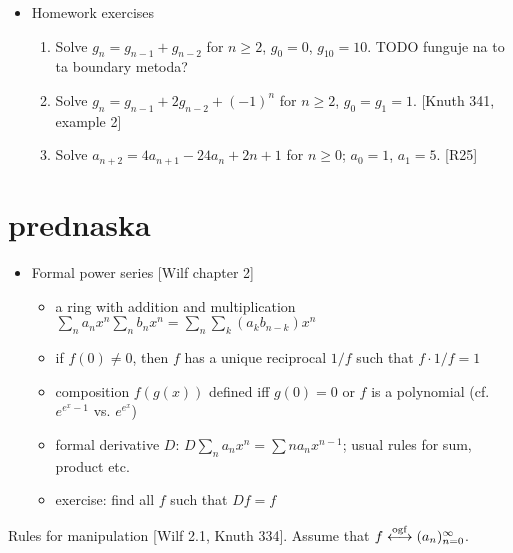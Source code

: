 \documentclass[10pt, a4paper]{article}
\def\ans#1{\big[\hskip 2mm {#1}\hskip 2mm\big]}
\def\ogf{\overset{{\rm ogf}}{\longleftrightarrow}}
\begin{document}
\begin{itemize}
\item Homework exercises
\begin{enumerate}
	\item Solve $g_n=g_{n-1}+g_{n-2}$ for $n\ge 2$, $g_0 = 0$, $g_{10} = 10$. \ans{$g_n = 2F_n/11$} TODO funguje na to ta boundary metoda?
    \item Solve $g_n=g_{n-1}+2g_{n-2}+(-1)^n$ for $n\ge 2$, $g_0 = g_1 = 1$. [Knuth 341, example 2]\\
            \ans{$G(x) = {1+x+x^2\over (1-2x)(1+x)^2}$; $g_n = {7\over 9}2^n + {1\over 9}(3n+2)(-1)^n$}
    \item Solve $a_{n+2}=4a_{n+1}-24a_n+2n+1$ for $n\ge 0$; $a_0 = 1$, $a_1=5$. [R25]\\
            \ans{$A(z) = {2\over 1-3z}-{1\over (1-z)^3}$; $a_n = 2\cdot 3^n -1-{n\choose 2}$ TODO zle riesenie asi} %
\end{enumerate}

\end{itemize}



\newpage

\section{prednaska}

\begin{itemize}

\item
Formal power series [Wilf chapter 2]
\begin{itemize}
    \item a ring with addition and multiplication $\sum_n a_nx^n\sum_n b_nx^n = \sum_n \sum_k (a_k b_{n-k})x^n$
    \item if $f(0)\neq 0$, then $f$ has a unique reciprocal $1/f$ such that $f\cdot 1/f = 1$
    \item composition $f(g(x))$ defined iff $g(0) = 0$ or $f$ is a polynomial (cf. $e^{e^x-1}$ vs. $e^{e^x}$)
    \item formal derivative $D$: $D\sum_n a_nx^n = \sum na_nx^{n-1}$; usual rules for sum, product etc.
    \item exercise: find all $f$ such that $Df = f$
\end{itemize}

\end{itemize}

Rules for manipulation [Wilf 2.1, Knuth 334]. Assume that $f\ogf (a_n)_{n=0}^\infty$.
\end{document}
